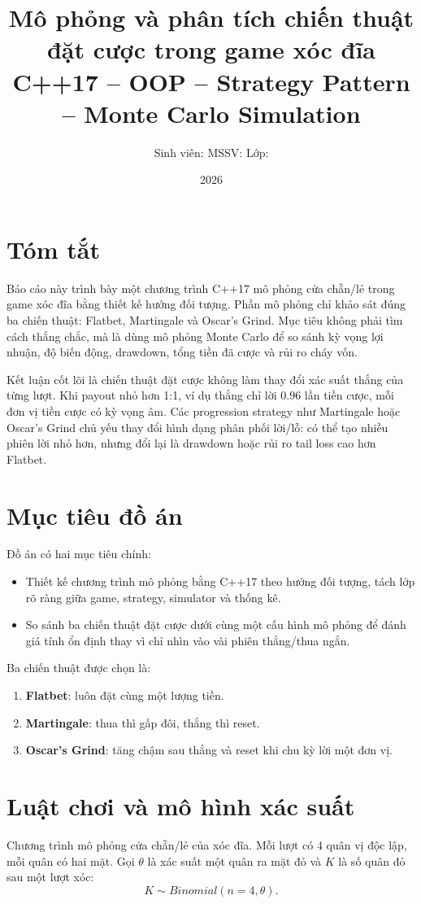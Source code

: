 \documentclass[12pt,a4paper]{article}
\title{\textbf{Mô phỏng và phân tích chiến thuật đặt cược trong game xóc đĩa}\\
\large C++17 -- OOP -- Strategy Pattern -- Monte Carlo Simulation}
\author{Sinh viên: \qquad MSSV: \qquad Lớp:}
\date{2026}
\begin{document}
\maketitle
\tableofcontents
\newpage

\section*{Tóm tắt}
Báo cáo này trình bày một chương trình C++17 mô phỏng cửa chẵn/lẻ trong game xóc đĩa bằng thiết kế hướng đối tượng. Phần mô phỏng chỉ khảo sát đúng ba chiến thuật: Flatbet, Martingale và Oscar's Grind. Mục tiêu không phải tìm cách thắng chắc, mà là dùng mô phỏng Monte Carlo để so sánh kỳ vọng lợi nhuận, độ biến động, drawdown, tổng tiền đã cược và rủi ro cháy vốn.

Kết luận cốt lõi là chiến thuật đặt cược không làm thay đổi xác suất thắng của từng lượt. Khi payout nhỏ hơn 1:1, ví dụ thắng chỉ lời \(0.96\) lần tiền cược, mỗi đơn vị tiền cược có kỳ vọng âm. Các progression strategy như Martingale hoặc Oscar's Grind chủ yếu thay đổi hình dạng phân phối lời/lỗ: có thể tạo nhiều phiên lời nhỏ hơn, nhưng đổi lại là drawdown hoặc rủi ro tail loss cao hơn Flatbet.

\section{Mục tiêu đồ án}
Đồ án có hai mục tiêu chính:
\begin{itemize}
  \item Thiết kế chương trình mô phỏng bằng C++17 theo hướng đối tượng, tách lớp rõ ràng giữa game, strategy, simulator và thống kê.
  \item So sánh ba chiến thuật đặt cược dưới cùng một cấu hình mô phỏng để đánh giá tính ổn định thay vì chỉ nhìn vào vài phiên thắng/thua ngắn.
\end{itemize}

Ba chiến thuật được chọn là:
\begin{enumerate}
  \item \textbf{Flatbet}: luôn đặt cùng một lượng tiền.
  \item \textbf{Martingale}: thua thì gấp đôi, thắng thì reset.
  \item \textbf{Oscar's Grind}: tăng chậm sau thắng và reset khi chu kỳ lời một đơn vị.
\end{enumerate}

\section{Luật chơi và mô hình xác suất}
Chương trình mô phỏng cửa chẵn/lẻ của xóc đĩa. Mỗi lượt có 4 quân vị độc lập, mỗi quân có hai mặt. Gọi \(\theta\) là xác suất một quân ra mặt đỏ và \(K\) là số quân đỏ sau một lượt xóc:
\[
K \sim Binomial(n=4,\theta).
\]
\end{document}
